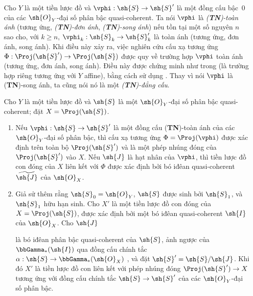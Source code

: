 \documentclass[oneside,10pt]{amsart}
\makeatletter
\renewcommand{\geq}{\geqslant}
\newcommand{\ega@arrow}[2]{\mathchoice{#1}{#2}{#2}{#2}}
\renewcommand{\to}{\ega@arrow{\longrightarrow}{\rightarrow}}
\newcommand{\oldpage}[2][]{\marginnote{\normalfont\footnotesize\textbf{#1}~|~#2}\ignorespaces}
\let\EGAOriginalLabel\label
\renewcommand{\label}[1]{\phantomsection\EGAOriginalLabel{#1}}
\makeatother
\begin{document}
\begin{env}[3.6.1]
\label{II.3.6.1}
Cho $Y$ là một tiền lược đồ và $\vphi:\sh{S}\to\sh{S}'$ là một đồng cấu bậc~$0$ của các $\sh{O}_Y$-đại số phân bậc quasi-coherent.
Ta nói $\vphi$ là \emph{(\textbf{TN})-toàn ánh} (tương ứng, \emph{(\textbf{TN})-đơn ánh}, \emph{(\textbf{TN})-song ánh}) nếu tồn tại một số nguyên $n$ sao cho, với $k\geq n$, $\vphi_k:\sh{S}_k\to\sh{S}'_k$ là toàn ánh (tương ứng, đơn ánh, song ánh).
Khi điều này xảy ra, việc nghiên cứu cấu xạ tương ứng $\Phi:\Proj(\sh{S}')\to\Proj(\sh{S})$ được quy về trường hợp $\vphi$ toàn ánh (tương ứng, đơn ánh, song ánh).
Điều này được chứng minh như trong  (là trường hợp riêng tương ứng với $Y$ affine), bằng cách sử dụng .
Thay vì nói $\vphi$ là (\textbf{TN})-song ánh, ta cũng nói nó là một \emph{(\textbf{TN})-đẳng cấu}.
\end{env}

\begin{proposition}[3.6.2]
\label{II.3.6.2}
Cho $Y$ là một tiền lược đồ và $\sh{S}$ là một $\sh{O}_Y$-đại số phân bậc quasi-coherent; đặt $X=\Proj(\sh{S})$.
\begin{enumerate}
  \item[(i)] Nếu $\vphi:\sh{S}\to\sh{S}'$ là một đồng cấu (\textbf{TN})-toàn ánh của các $\sh{O}_Y$-đại số phân bậc, thì cấu xạ tương ứng $\Phi=\Proj(\vphi)$  được xác định trên toàn bộ $\Proj(\sh{S}')$ và là một phép nhúng đóng của $\Proj(\sh{S}')$ vào $X$.
    Nếu $\sh{J}$ là hạt nhân của $\vphi$, thì tiền lược đồ con đóng của $X$ liên kết với $\Phi$ được xác định bởi bó iđêan quasi-coherent $\widetilde{\sh{J}}$ của $\sh{O}_X$.
  \item[(ii)] Giả sử thêm rằng $\sh{S}_0=\sh{O}_Y$, $\sh{S}$ được sinh bởi $\sh{S}_1$, và $\sh{S}_1$ hữu hạn sinh.
    Cho $X'$ là một tiền lược đồ con đóng của $X=\Proj(\sh{S})$, được xác định bởi một bó iđêan quasi-coherent $\sh{I}$ của $\sh{O}_X$.
    Cho $\sh{J}$
\oldpage[II]{65}

là bó iđêan phân bậc quasi-coherent của $\sh{S}$, ảnh ngược của $\bbGamma_*(\sh{I})$ qua đồng cấu chính tắc $\alpha:\sh{S}\to\bbGamma_*(\sh{O}_X)$ , và đặt $\sh{S}'=\sh{S}/\sh{J}$.
Khi đó $X'$ là tiền lược đồ con liên kết  với phép nhúng đóng $\Proj(\sh{S}')\to X$ tương ứng với đồng cấu chính tắc $\sh{S}\to\sh{S}'$ của các $\sh{O}_Y$-đại số phân bậc.
\end{enumerate}
\end{proposition}
\end{document}
